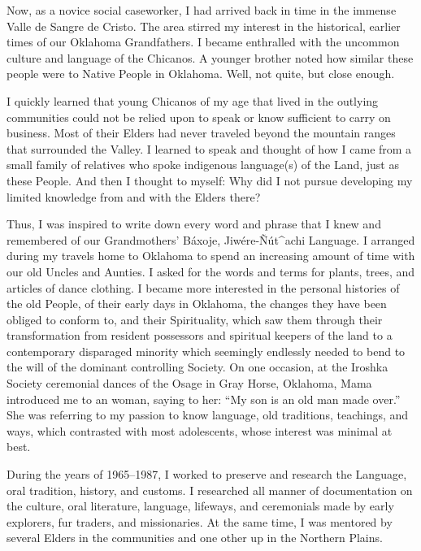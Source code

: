 \documentclass[output=paper]{LSP/langsci}
\begin{document}
Now, as a novice social caseworker, I had arrived back in time in the immense Valle de Sangre de Cristo. The area stirred my interest in the historical, earlier times of our Oklahoma Grandfathers. I became enthralled with the uncommon culture and language of the Chicanos. A younger brother noted how similar these people were to Native People in Oklahoma. Well, not quite, but close enough.

I quickly learned that young Chicanos of my age that lived in the outlying communities could not be relied upon to speak  or know sufficient  to carry on business. Most of their Elders had never traveled beyond the mountain ranges that surrounded the Valley. I learned to speak  and thought of how I came from a small family of relatives who spoke indigenous language(s) of the Land, just as these People. And then I thought to myself: Why did I not pursue developing my limited knowledge from and with the Elders there?

Thus, I was inspired to write down every word and phrase that I knew and remembered of our Grandmothers' Báxoje, Jiwére-\~Nút\^{ }achi Language. I arranged during my travels home to Oklahoma to spend an increasing amount of time with our old Uncles and Aunties. I asked for the words and terms for plants, trees, and articles of dance clothing. I became more interested in the personal histories of the old People, of their early days in Oklahoma, the changes they have been obliged to conform to, and their Spirituality, which saw them through their transformation from resident possessors and spiritual keepers of the land to a contemporary disparaged minority which seemingly endlessly needed to bend to the will of the dominant controlling Society. On one occasion, at the Iroshka Society ceremonial dances of the O\-sage in Gray Horse, Oklahoma, Mama introduced me to an  woman, saying to her: ``My son is an old man made over.'' She was referring to my passion to know language, old traditions, teachings, and ways, which contrasted with most adolescents, whose interest was minimal at best.

During the years of 1965--1987, I worked to preserve and research the  Language, oral tradition, history, and customs. I researched all manner of documentation on the  culture, oral literature, language, lifeways, and ceremonials made by early explorers, fur traders, and missionaries. At the same time, I was mentored by several Elders in the  communities and one other up in the Northern Plains.
\end{document}
